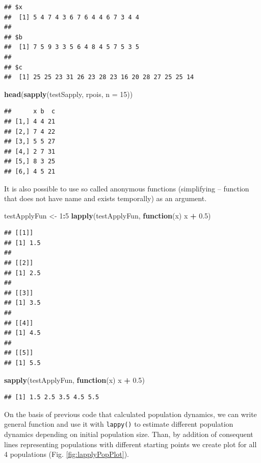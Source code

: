 \documentclass[]{book}
\newenvironment{Shaded}{\begin{snugshade}}{\end{snugshade}}
\newcommand{\KeywordTok}[1]{\textcolor[rgb]{0.13,0.29,0.53}{\textbf{#1}}}
\newcommand{\DataTypeTok}[1]{\textcolor[rgb]{0.13,0.29,0.53}{#1}}
\newcommand{\DecValTok}[1]{\textcolor[rgb]{0.00,0.00,0.81}{#1}}
\newcommand{\FloatTok}[1]{\textcolor[rgb]{0.00,0.00,0.81}{#1}}
\newcommand{\StringTok}[1]{\textcolor[rgb]{0.31,0.60,0.02}{#1}}
\newcommand{\ControlFlowTok}[1]{\textcolor[rgb]{0.13,0.29,0.53}{\textbf{#1}}}
\newcommand{\OperatorTok}[1]{\textcolor[rgb]{0.81,0.36,0.00}{\textbf{#1}}}
\newcommand{\NormalTok}[1]{#1}
\theoremstyle{definition}
\theoremstyle{definition}
\theoremstyle{definition}
\theoremstyle{remark}
\begin{document}
\begin{verbatim}
## $x
##  [1] 5 4 7 4 3 6 7 6 4 4 6 7 3 4 4
## 
## $b
##  [1] 7 5 9 3 3 5 6 4 8 4 5 7 5 3 5
## 
## $c
##  [1] 25 25 23 31 26 23 28 23 16 20 28 27 25 25 14
\end{verbatim}

\begin{Shaded}
\begin{Highlighting}[]
\KeywordTok{head}\NormalTok{(}\KeywordTok{sapply}\NormalTok{(testSapply, rpois, }\DataTypeTok{n =} \DecValTok{15}\NormalTok{))}
\end{Highlighting}
\end{Shaded}

\begin{verbatim}
##      x b  c
## [1,] 4 4 21
## [2,] 7 4 22
## [3,] 5 5 27
## [4,] 2 7 31
## [5,] 8 3 25
## [6,] 4 5 21
\end{verbatim}

It is also possible to use so called anonymous functions (simplifying --
function that does not have name and exists temporally) as an argument.

\begin{Shaded}
\begin{Highlighting}[]
\NormalTok{testApplyFun <-}\StringTok{ }\DecValTok{1}\OperatorTok{:}\DecValTok{5}
\KeywordTok{lapply}\NormalTok{(testApplyFun, }\ControlFlowTok{function}\NormalTok{(x) x }\OperatorTok{+}\StringTok{ }\FloatTok{0.5}\NormalTok{)}
\end{Highlighting}
\end{Shaded}

\begin{verbatim}
## [[1]]
## [1] 1.5
## 
## [[2]]
## [1] 2.5
## 
## [[3]]
## [1] 3.5
## 
## [[4]]
## [1] 4.5
## 
## [[5]]
## [1] 5.5
\end{verbatim}

\begin{Shaded}
\begin{Highlighting}[]
\KeywordTok{sapply}\NormalTok{(testApplyFun, }\ControlFlowTok{function}\NormalTok{(x) x }\OperatorTok{+}\StringTok{ }\FloatTok{0.5}\NormalTok{)}
\end{Highlighting}
\end{Shaded}

\begin{verbatim}
## [1] 1.5 2.5 3.5 4.5 5.5
\end{verbatim}

On the basis of previous code that calculated population dynamics, we
can write general function and use it with \texttt{lappy()} to estimate
different population dynamics depending on initial population size.
Than, by addition of consequent lines representing populations with
different starting points we create plot for all 4 populations (Fig.
\ref{fig:lapplyPopPlot}).
\end{document}
